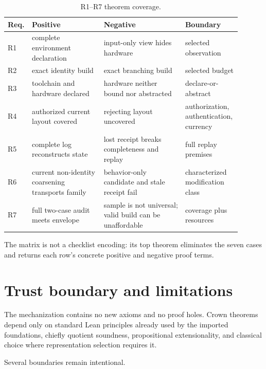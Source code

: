 \documentclass[11pt]{article}
\begin{document}
\begin{table}[ht]
\centering
\scriptsize
\begin{tabular}{@{}p{0.05\linewidth}p{0.30\linewidth}p{0.34\linewidth}p{0.21\linewidth}@{}}
\toprule
Req. & Positive & Negative & Boundary \\
\midrule
R1 & complete environment declaration & input-only view hides hardware & selected observation \\
R2 & exact identity build & exact branching build & selected budget \\
R3 & toolchain and hardware declared & hardware neither bound nor abstracted & declare-or-abstract \\
R4 & authorized current layout covered & rejecting layout uncovered & authorization, authentication, currency \\
R5 & complete log reconstructs state & lost receipt breaks completeness and replay & full replay premises \\
R6 & current non-identity coarsening transports family & behavior-only candidate and stale receipt fail & characterized modification class \\
R7 & full two-case audit meets envelope & sample is not universal; valid build can be unaffordable & coverage plus resources \\
\bottomrule
\end{tabular}
\caption{R1--R7 theorem coverage.}
\label{tab:coverage}
\end{table}

The matrix is not a checklist encoding: its top theorem eliminates the seven
cases and returns each row's concrete positive and negative proof terms.

\section{Trust boundary and limitations}

The mechanization contains no new axioms and no proof holes.  Crown theorems
depend only on standard Lean principles already used by the imported
foundations, chiefly quotient soundness, propositional extensionality, and
classical choice where representation selection requires it.

Several boundaries remain intentional.
\end{document}
